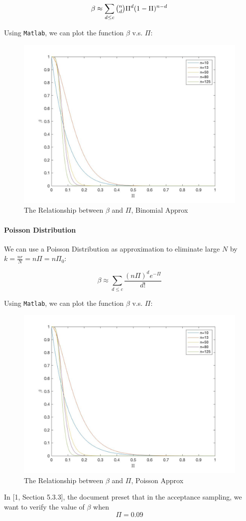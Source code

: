 \documentclass[a4paper]{article}
\begin{document}
$$\beta \approx \sum_{d\leq c}\tbinom{n}{d}\Pi^d(1-\Pi)^{n-d}$$

Using \texttt{Matlab}, we can plot the function $\beta$ v.s. $\Pi$:

\begin{figure}[!htbp] 
\centering 
\includegraphics[width=0.6\linewidth]{beta-pi-b.jpg}  
\caption{The Relationship between $\beta$ and $\Pi$, Binomial Approx} 
\end{figure}

\paragraph{Poisson Distribution}
We can use a Poisson Distribution as approximation to eliminate large $N$ by $k = \displaystyle\frac{nr}{N}=n\Pi=n\Pi_0$:

$$\beta \approx \sum_{d\leq c} \frac{(n\Pi)^de^{-\Pi}}{d!}$$

Using \texttt{Matlab}, we can plot the function $\beta$ v.s. $\Pi$:

\begin{figure}[!htbp] 
\centering 
\includegraphics[width=0.6\linewidth]{beta-pi-p.jpg}  
\caption{The Relationship between $\beta$ and $\Pi$, Poisson Approx} 
\end{figure}

In [1, Section 5.3.3], the document preset that in the acceptance sampling, we want to verify the value of $\beta$ when
$$\Pi = 0.09$$
\end{document}
